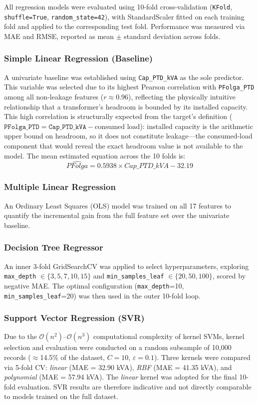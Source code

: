\documentclass[conference]{IEEEtran}
\begin{document}
All regression models were evaluated using 10-fold cross-validation (\texttt{KFold}, \texttt{shuffle=True}, \texttt{random\_state=42}), with StandardScaler fitted on each training fold and applied to the corresponding test fold. Performance was measured via MAE and RMSE, reported as mean $\pm$ standard deviation across folds.

\subsubsection{Simple Linear Regression (Baseline)}
A univariate baseline was established using \texttt{Cap\_PTD\_kVA} as the sole predictor. This variable was selected due to its highest Pearson correlation with \texttt{PFolga\_PTD} among all non-leakage features ($r \approx 0.96$), reflecting the physically intuitive relationship that a transformer's headroom is bounded by its installed capacity. This high correlation is structurally expected from the target's definition ($\texttt{PFolga\_PTD} = \texttt{Cap\_PTD\_kVA} - \text{consumed load}$): installed capacity is the arithmetic upper bound on headroom, so it does not constitute leakage---the consumed-load component that would reveal the exact headroom value is not available to the model. The mean estimated equation across the 10 folds is:
\begin{equation}
\widehat{PFolga} = 0.5938 \times Cap\_PTD\_kVA - 32.19
\end{equation}

\subsubsection{Multiple Linear Regression}
An Ordinary Least Squares (OLS) model was trained on all 17 features to quantify the incremental gain from the full feature set over the univariate baseline.

\subsubsection{Decision Tree Regressor}
An inner 3-fold GridSearchCV was applied to select hyperparameters, exploring \texttt{max\_depth} $\in \{3, 5, 7, 10, 15\}$ and \texttt{min\_samples\_leaf} $\in \{20, 50, 100\}$, scored by negative MAE. The optimal configuration (\texttt{max\_depth}=10, \texttt{min\_samples\_leaf}=20) was then used in the outer 10-fold loop.

\subsubsection{Support Vector Regression (SVR)}
Due to the $\mathcal{O}(n^2)$--$\mathcal{O}(n^3)$ computational complexity of kernel SVMs, kernel selection and evaluation were conducted on a random subsample of 10,000 records ($\approx$14.5\% of the dataset, $C=10$, $\varepsilon=0.1$). Three kernels were compared via 5-fold CV: \textit{linear} (MAE = 32.90 kVA), \textit{RBF} (MAE = 41.35 kVA), and \textit{polynomial} (MAE = 57.94 kVA). The \textit{linear} kernel was adopted for the final 10-fold evaluation. SVR results are therefore indicative and not directly comparable to models trained on the full dataset.
\end{document}
